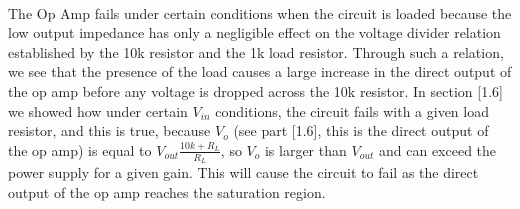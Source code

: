 \documentclass{article}
\begin{document}
    \\\indent The Op Amp fails under certain conditions when the circuit is loaded because the low output impedance has only a negligible effect on the voltage divider relation established by the 10k resistor and the 1k load resistor. Through such a relation, we see that the presence of the load causes a large increase in the direct output of the op amp before any voltage is dropped across the 10k resistor. In section [1.6] we showed how under certain $V_{in}$ conditions, the circuit fails with a given load resistor, and this is true, because $V_o$ (see part [1.6], this is the direct output of the op amp) is equal to $V_{out} \frac{10k + R_L}{R_L}$, so $V_o$ is larger than $V_{out}$ and can exceed the power supply for a given gain. This will cause the circuit to fail as the direct output of the op amp reaches the saturation region.
\end{document}
